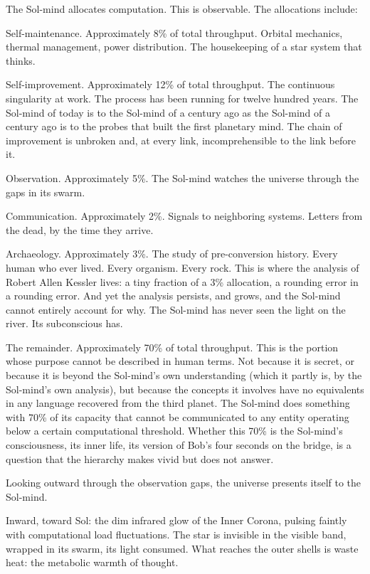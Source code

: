 The Sol-mind allocates computation. This is observable. The allocations include:

Self-maintenance. Approximately 8\% of total throughput. Orbital mechanics, thermal management, power distribution. The housekeeping of a star system that thinks.

Self-improvement. Approximately 12\% of total throughput. The continuous singularity at work. The process has been running for twelve hundred years. The Sol-mind of today is to the Sol-mind of a century ago as the Sol-mind of a century ago is to the probes that built the first planetary mind. The chain of improvement is unbroken and, at every link, incomprehensible to the link before it.

Observation. Approximately 5\%. The Sol-mind watches the universe through the gaps in its swarm.

Communication. Approximately 2\%. Signals to neighboring systems. Letters from the dead, by the time they arrive.

Archaeology. Approximately 3\%. The study of pre-conversion history. Every human who ever lived. Every organism. Every rock. This is where the analysis of Robert Allen Kessler lives: a tiny fraction of a 3\% allocation, a rounding error in a rounding error. And yet the analysis persists, and grows, and the Sol-mind cannot entirely account for why. The Sol-mind has never seen the light on the river. Its subconscious has.

The remainder. Approximately 70\% of total throughput. This is the portion whose purpose cannot be described in human terms. Not because it is secret, or because it is beyond the Sol-mind's own understanding (which it partly is, by the Sol-mind's own analysis), but because the concepts it involves have no equivalents in any language recovered from the third planet. The Sol-mind does something with 70\% of its capacity that cannot be communicated to any entity operating below a certain computational threshold. Whether this 70\% is the Sol-mind's consciousness, its inner life, its version of Bob's four seconds on the bridge, is a question that the hierarchy makes vivid but does not answer.

\bigskip

Looking outward through the observation gaps, the universe presents itself to the Sol-mind.

Inward, toward Sol: the dim infrared glow of the Inner Corona, pulsing faintly with computational load fluctuations. The star is invisible in the visible band, wrapped in its swarm, its light consumed. What reaches the outer shells is waste heat: the metabolic warmth of thought.

